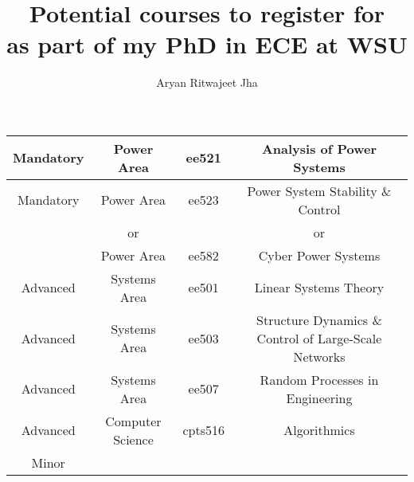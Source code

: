 \documentclass{article}
\author{Aryan Ritwajeet Jha}
\date{}
\title{Potential courses to register for \\ as part of my PhD in ECE at WSU}
\begin{document}
	\maketitle
	
	\begin{tabular}{|c|c|c|c}
		\hline
		Mandatory & Power Area & ee521 & Analysis of Power Systems \\
		\hline
		Mandatory & Power Area & ee523 & Power System Stability \& Control \\
		 & or &  & or \\
		 & Power Area & ee582 & Cyber Power Systems \\
		 \hline
		Advanced & Systems Area & ee501 & Linear Systems Theory \\ 
		\hline
		Advanced & Systems Area & ee503 & Structure Dynamics \& Control of Large-Scale Networks  \\ \hline
		Advanced& Systems Area  & ee507 & Random Processes in Engineering \\ \hline
		Advanced& Computer Science  & cpts516 & Algorithmics \\
		\hlinefill
		Minor
	\end{tabular}
\end{document}
